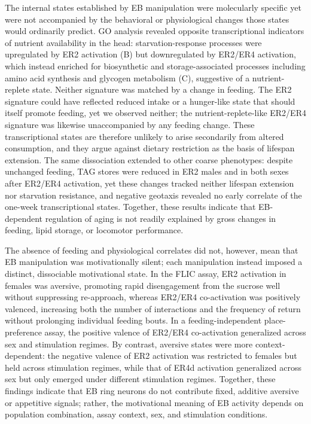 The internal states established by EB manipulation were molecularly specific yet were not accompanied by the behavioral or physiological changes those states would ordinarily predict.
GO analysis revealed opposite transcriptional indicators of nutrient availability in the head: starvation-response processes were upregulated by ER2 activation (B) but downregulated by ER2/ER4 activation, which instead enriched for biosynthetic and storage-associated processes including amino acid synthesis and glycogen metabolism (C), suggestive of a nutrient-replete state.
Neither signature was matched by a change in feeding.
The ER2 signature could have reflected reduced intake or a hunger-like state that should itself promote feeding, yet we observed neither; the nutrient-replete-like ER2/ER4 signature was likewise unaccompanied by any feeding change.
These transcriptional states are therefore unlikely to arise secondarily from altered consumption, and they argue against dietary restriction as the basis of lifespan extension.
The same dissociation extended to other coarse phenotypes: despite unchanged feeding, TAG stores were reduced in ER2 males and in both sexes after ER2/ER4 activation, yet these changes tracked neither lifespan extension nor starvation resistance, and negative geotaxis revealed no early correlate of the one-week transcriptional states.
Together, these results indicate that EB-dependent regulation of aging is not readily explained by gross changes in feeding, lipid storage, or locomotor performance.

The absence of feeding and physiological correlates did not, however, mean that EB manipulation was motivationally silent; each manipulation instead imposed a distinct, dissociable motivational state.
In the FLIC assay, ER2 activation in females was aversive, promoting rapid disengagement from the sucrose well without suppressing re-approach, whereas ER2/ER4 co-activation was positively valenced, increasing both the number of interactions and the frequency of return without prolonging individual feeding bouts.
In a feeding-independent place-preference assay, the positive valence of ER2/ER4 co-activation generalized across sex and stimulation regimes. By contrast, aversive states were more context-dependent: the negative valence of ER2 activation was restricted to females but held across stimulation regimes, while that of ER4d activation generalized across sex but only emerged under different stimulation regimes.
Together, these findings indicate that EB ring neurons do not contribute fixed, additive aversive or appetitive signals; rather, the motivational meaning of EB activity depends on population combination, assay context, sex, and stimulation conditions.

